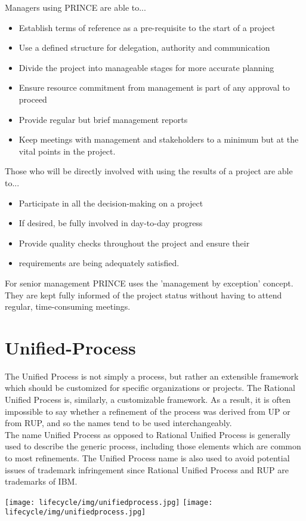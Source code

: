 \begin{minipage}[t]{0.5\linewidth}
\ifslides
\newpage
\fi
Managers using PRINCE are able to...
\begin{itemize}
\item Establish terms of reference as a pre-requisite to the start of a
  project
\item Use a defined structure for delegation, authority and communication
\item Divide the project into manageable stages for more accurate planning
\item Ensure resource commitment from management is part of any approval to
  proceed
\item Provide regular but brief management reports
\item Keep meetings with management and stakeholders to a minimum but at the
  vital points in the project.
\end{itemize}
\ifslides
\newpage
\fi
Those who will be directly involved with using the results of a project are able to...
\begin{itemize}
\item Participate in all the decision-making on a project
\item If desired, be fully involved in day-to-day progress
\item Provide quality checks throughout the project and ensure their
\item requirements are being adequately satisfied.
\end{itemize}
For senior management PRINCE uses the 'management by exception' concept. They
are kept fully informed of the project status without having to attend
regular, time-consuming meetings.
\ifslides
\else
\newpage
\fi
\section{Unified-Process}
\ifslides
\else
The Unified Process is not simply a process, but rather an extensible
framework which should be customized for specific organizations or
projects. The Rational Unified Process is, similarly, a customizable
framework. As a result, it is often impossible to say whether a
refinement of the process was derived from UP or from RUP, and so
the names tend to be used interchangeably.\\

The name Unified Process as opposed to Rational Unified Process is
generally used to describe the generic process, including those elements
which are common to most refinements. The Unified Process name is also
used to avoid potential issues of trademark infringement since Rational
Unified Process and RUP are trademarks of IBM.
\fi
\begin{center}
\ifslides
\texttt{[image: lifecycle/img/unifiedprocess.jpg]}
\else
\texttt{[image: lifecycle/img/unifiedprocess.jpg]}
\fi
\end{center}
\vspace{1.5cm}


\end{minipage}
